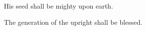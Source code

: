\noindent \vv His seed shall be mighty upon earth.

\noindent \rr The generation of the upright shall be blessed.